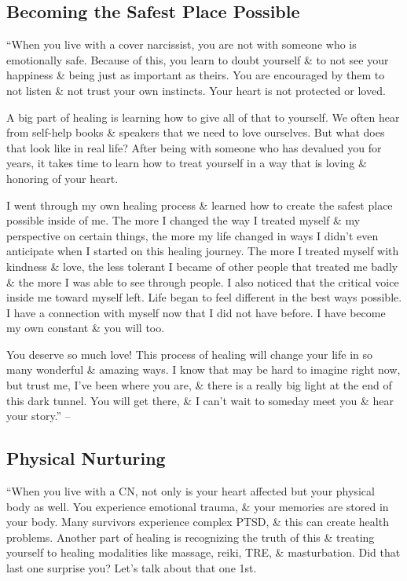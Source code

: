 \documentclass{article}
\numberwithin{equation}{section}
\begin{document}
\subsection{Becoming the Safest Place Possible}
``When you live with a cover narcissist, you are not with someone who is emotionally safe. Because of this, you learn to doubt yourself \& to not see your happiness \& being just as important as theirs. You are encouraged by them to not listen \& not trust your own instincts. Your heart is not protected or loved.

A big part of healing is learning how to give all of that to yourself. We often hear from self-help books \& speakers that we need to love ourselves. But what does that look like in real life? After being with someone who has devalued you for years, it takes time to learn how to treat yourself in a way that is loving \& honoring of your heart.

I went through my own healing process \& learned how to create the safest place possible inside of me. The more I changed the way I treated myself \& my perspective on certain things, the more my life changed in ways I didn't even anticipate when I started on this healing journey. The more I treated myself with kindness \& love, the less tolerant I became of other people that treated me badly \& the more I was able to see through people. I also noticed that the critical voice inside me toward myself left. Life began to feel different in the best ways possible. I have a connection with myself now that I did not have before. I have become my own constant \& you will too.

You deserve so much love! This process of healing will change your life in so many wonderful \& amazing ways. I know that may be hard to imagine right now, but trust me, I've been where you are, \& there is a really big light at the end of this dark tunnel. You will get there, \& I can't wait to someday meet you \& hear your story.'' -- \cite[pp. 159--160]{Mirza2017}

\subsection{Physical Nurturing}
``When you live with a CN, not only is your heart affected but your physical body as well. You experience emotional trauma, \& your memories are stored in your body. Many survivors experience complex PTSD, \& this can create health problems. Another part of healing is recognizing the truth of this \& treating yourself to healing modalities like massage, reiki, TRE, \& masturbation. Did that last one surprise you? Let's talk about that one 1st.
\end{document}
